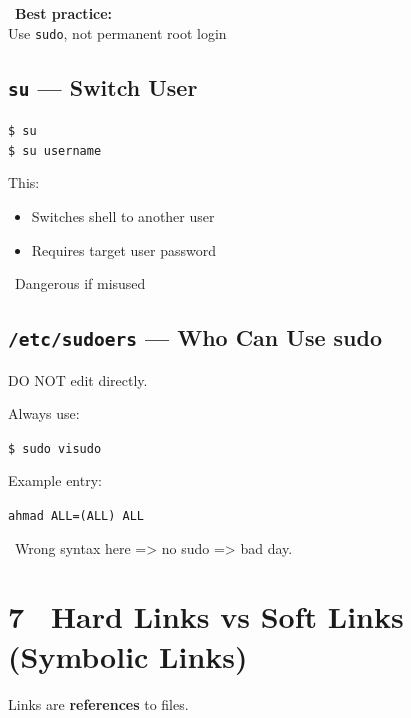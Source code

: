 \documentclass[12pt]{article}
\newcommand{\linkicon}{\faLink}
\newcommand{\warningicon}{\faExclamationTriangle}
\newcommand{\handicon}{\faHandPointRight}
\begin{document}
\begin{infobox}
\handicon\ \textbf{Best practice:}\\
Use \texttt{sudo}, not permanent root login
\end{infobox}

\subsection*{\texttt{su} — Switch User}

\begin{highlightbox}
\texttt{\$ su}\\
\texttt{\$ su username}
\end{highlightbox}

This:

\begin{itemize}
    \item Switches shell to another user
    \item Requires target user password
\end{itemize}

\begin{warningbox}
\warningicon\ Dangerous if misused
\end{warningbox}

\subsection*{\texttt{/etc/sudoers} — Who Can Use sudo}

DO NOT edit directly.

Always use:

\begin{highlightbox}
\texttt{\$ sudo visudo}
\end{highlightbox}

Example entry:

\begin{highlightbox}
\texttt{ahmad ALL=(ALL) ALL}
\end{highlightbox}

\begin{warningbox}
\warningicon\ Wrong syntax here => no sudo => bad day.
\end{warningbox}

\section*{7 \linkicon\ Hard Links vs Soft Links (Symbolic Links)}

Links are \textbf{references} to files.
\end{document}
